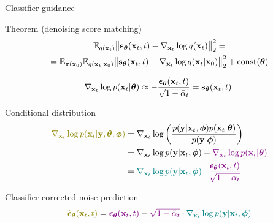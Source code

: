 \begin{frame}{Classifier guidance}
	\begin{block}{Theorem (denoising score matching)}
		\vspace{-0.8cm}
		\begin{multline*}
			\mathbb{E}_{q(\mathbf{x}_{t})}\bigl\| \mathbf{s}_{\boldsymbol{\theta}}(\mathbf{x}_t, t) - \nabla_{\mathbf{x}_t} \log q(\mathbf{x}_t) \bigr\|^2_2 = \\ = \mathbb{E}_{\pi(\mathbf{x}_0)} \mathbb{E}_{q(\mathbf{x}_t | \mathbf{x}_0)}\bigl\| \mathbf{s}_{\boldsymbol{\theta}}(\mathbf{x}_t, t) - \nabla_{\mathbf{x}_t} \log q(\mathbf{x}_t | \mathbf{x}_0) \bigr\|^2_2 + \text{const}(\boldsymbol{\theta})
		\end{multline*}
		\vspace{-1.0cm}
	\end{block}
	\[
		\nabla_{\mathbf{x}_t} \log p(\mathbf{x}_t | \boldsymbol{\theta}) \approx - \frac{\boldsymbol{\epsilon}_{\boldsymbol{\theta}}(\mathbf{x}_t, t)}{\sqrt{1 - \bar{\alpha}_t}} = \mathbf{s}_{\boldsymbol{\theta}}(\mathbf{x}_t, t).
	\]
	\vspace{-0.4cm}
	\begin{block}{Conditional distribution}
		\vspace{-0.7cm}
		\begin{align*}
			{\color{olive}\nabla_{\bx_t} \log p(\bx_t | \by, \btheta, \bphi)} &= \nabla_{\bx_t} \log \left(\frac{p(\by | \bx_t, \bphi)p(\bx_t | \btheta)}{p(\by | \bphi)} \right)\\
			&= \nabla_{\bx_t} \log p(\by | \bx_t, \bphi) + {\color{violet}\nabla_{\bx_t} \log p(\bx_t | \btheta)}\\
			&= {\color{teal}\nabla_{\bx_t} \log p(\by | \bx_t, \bphi)} {\color{violet}- \frac{\bepsilon_{\btheta}(\bx_t, t)}{\sqrt{1 - \bar{\alpha}_t}}}
		\end{align*}
		\vspace{-0.7cm}
	\end{block}
	\begin{block}{Classifier-corrected noise prediction}
		\vspace{-0.4cm}
		\[
			{\color{olive}\hat{\bepsilon}_{\btheta}(\bx_t, t)} = {\color{violet}\bepsilon_{\btheta}(\bx_t, t)} - {\color{violet}\sqrt{1 - \bar{\alpha}_t}} \cdot {\color{teal}\nabla_{\bx_t} \log p(\by | \bx_t, \bphi)}
		\]
	\end{block}
\end{frame}
